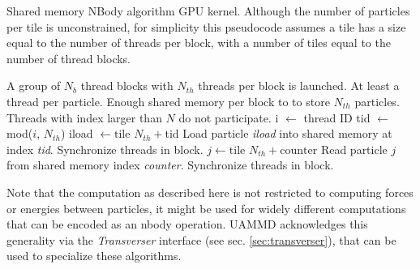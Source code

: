\documentclass[ twoside,openright,titlepage,numbers=noenddot,%
headinclude,footinclude,cleardoublepage=empty,abstract=on,
BCOR=5mm,paper=a4,fontsize=11pt, dvipsnames
]{scrreprt}
\newcommand{\uammd}{\gls{UAMMD}\xspace}
\begin{document}
\begin{algorithm}
  \caption{Shared memory NBody algorithm GPU kernel. Although the number of particles per tile is unconstrained, for simplicity this pseudocode assumes a tile has a size equal to the number of threads per block, with a number of tiles equal to the number of thread blocks.} \label{alg:nbody}
  \begin{algorithmic}[1]
    \Require
    \Statex A group of $N_b$ thread blocks with $N_{th}$ threads per block is launched.
    \Statex At least a thread per particle.
    \Statex Enough shared memory per block to to store $N_{th}$ particles.
    \Ensure
    \Statex Threads with index larger than $N$ do not participate.
    \State i $\gets$ thread ID 
    \State tid $\gets$ mod($i$, $N_{th}$) 
    \State iload $\gets \text{tile } N_{th}+$tid
    \State Load particle \emph{iload} into shared memory at index \emph{tid}.
    \State Synchronize threads in block. 
    \State $j \gets \text{tile }N_{th} + \text{counter}$
    \State Read particle $j$ from shared memory index \emph{counter}.
    \EndFor
    \State Synchronize threads in block. 
    \EndFor
  \end{algorithmic}
\end{algorithm}

Note that the computation as described here is not restricted to computing forces or energies between particles, it might be used for widely different computations that can be encoded as an nbody operation.
\uammd acknowledges this generality via the \emph{Transverser} interface (see sec. \ref{sec:transverser}), that can be used to specialize these algorithms. 
\end{document}
